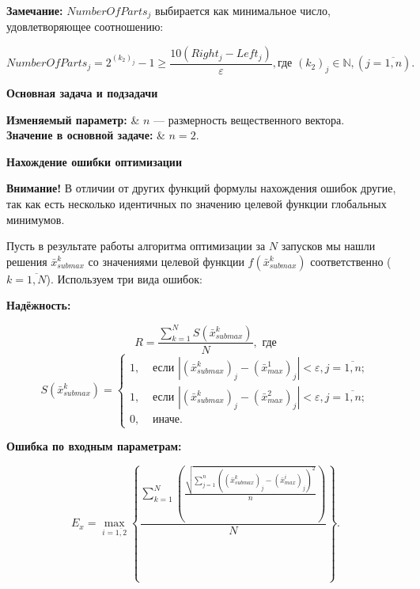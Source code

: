 \documentclass[a4paper,12pt]{article}
\begin{document}
\textbf{Замечание:}  $NumberOfParts_j$ выбирается как минимальное число, удовлетворяющее соотношению:

\begin{equation*}
NumberOfParts_j=2^{\left( k_2\right)_j }-1\geq\dfrac{10\left( Right_j-Left_j\right) }{\varepsilon},\text{где } \left( k_2\right)_j \in \mathbb{N}, \left( j=\overline{1,n}\right).
\end{equation*}

\textbf {Основная задача и подзадачи}

\begin{tabularwide}
\textbf{Изменяемый параметр: } & $n$ --- размерность вещественного вектора. \\
\textbf{Значение в основной задаче:} & $n=2$.\\
\end{tabularwide}

\textbf {Нахождение ошибки оптимизации}

{\color{red} \textbf{Внимание!} В отличии от других функций формулы нахождения ошибок другие, так как есть несколько идентичных по значению целевой функции глобальных минимумов.}

Пусть в результате работы алгоритма оптимизации за $N$ запусков мы нашли решения $\bar{x}_{submax}^k$ со значениями целевой функции $f\left( \bar{x}_{submax}^k\right) $ соответственно ($k=\overline{1,N}$). Используем три вида ошибок:

\textbf{Надёжность: }

\begin{equation*}
R = \dfrac{\sum_{k=1}^{N}S\left( \bar{x}_{submax}^k \right) }{N}, \text{ где}
\end{equation*}
\begin{equation*}
S\left( \bar{x}_{submax}^k \right)=\left\lbrace \begin{aligned} 1,& \text{ если } \left| \left( \bar{x}_{submax}^k \right)_j-\left( \bar{x}_{max}^1 \right)_j\right|<\varepsilon, j=\overline{1,n};   \\ 1,& \text{ если } \left| \left( \bar{x}_{submax}^k \right)_j-\left( \bar{x}_{max}^2 \right)_j\right|<\varepsilon, j=\overline{1,n};   \\ 0,& \text{ иначе}. \end{aligned}\right.
\end{equation*}

\textbf{Ошибка по входным параметрам:}

\begin{equation*}
E_x = \max_{i=\overline{1,2}} \left\lbrace  \frac{\sum_{k=1}^{N} \left( \frac{\sqrt{\sum_{j=1}^{n}{\left( \left( \bar{x}_{submax}^k \right)_j-\left( \bar{x}_{max}^i \right)_j \right)}^2 }}{n} \right)  }{N}\right\rbrace  .
\end{equation*}
\end{document}
